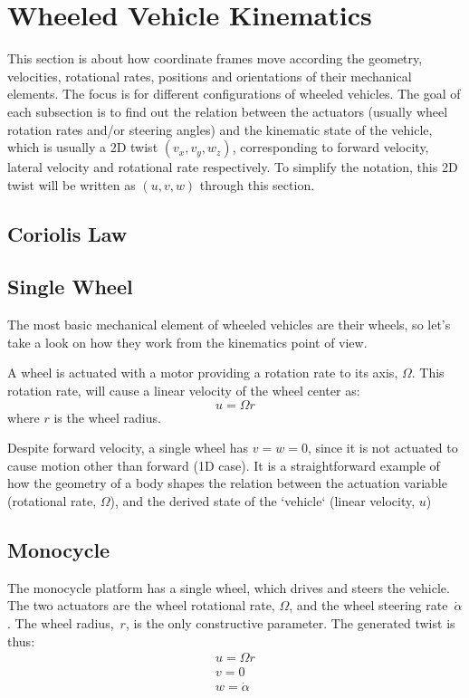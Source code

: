 \section{Wheeled Vehicle Kinematics}
This section is about how coordinate frames move according the geometry, velocities, rotational rates, positions and orientations of their mechanical elements. The focus is for different configurations of wheeled vehicles. The goal of each subsection is to find out the relation between the actuators (usually wheel rotation rates and/or steering angles) and the kinematic state of the vehicle, which is usually a 2D twist $(v_x, v_y, w_z)$, corresponding to forward velocity, lateral velocity and rotational rate respectively. To simplify the notation, this 2D twist will be written as $(u, v, w)$ through this section. 

\subsection{Coriolis Law}

\subsection{Single Wheel}
The most basic mechanical element of wheeled vehicles are their wheels, so let's take a look on how they work from the kinematics point of view.

A wheel is actuated with a motor providing a rotation rate to its axis, $\Omega$. This rotation rate, will cause a linear velocity of the wheel center as: 
\begin{equation}
 u = \Omega r
\end{equation}
where $r$ is the wheel radius. 

Despite forward velocity, a single wheel has $v = w = 0$, since it is not actuated to cause motion other than forward (1D case). It is a straightforward example of how the geometry of a body shapes the relation between the actuation variable (rotational rate, $\Omega$), and the derived state of the `vehicle` (linear velocity, $u$)

\subsection{Monocycle}
The monocycle platform has a single wheel, which drives and steers the vehicle. The two actuators are the wheel rotational rate, $\Omega$, and the wheel steering rate~$\dot{\alpha}$. The wheel radius,~$r$, is the only constructive parameter. The generated twist is thus: 
\begin{align}
u = \Omega r \\
v = 0 \\
w = \dot{\alpha}
\end{align} 


